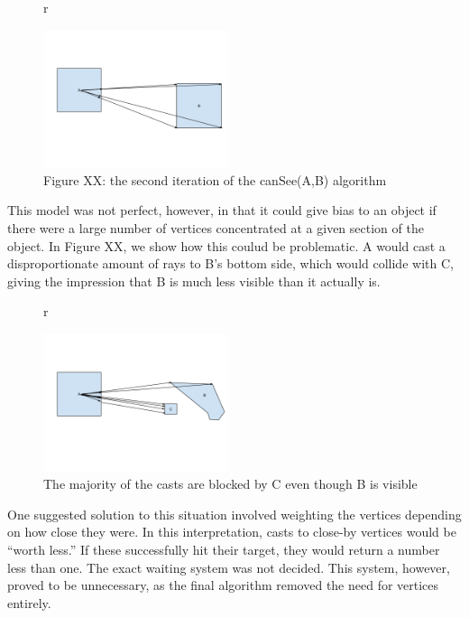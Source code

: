\begin{figure}{r}
	\begin{center}
		\includegraphics[width=0.48\textwidth]{figures/vision5.png}
	\end{center}
	\caption{Figure XX: the second iteration of the canSee(A,B) algorithm}
\end{figure}

This model was not perfect, however, in that it could give bias to an object if there were a large number of vertices concentrated at a given section of the object. In Figure XX, we show how this coulud be problematic. A would cast a disproportionate amount of rays to B's bottom side, which would collide with C, giving the impression that B is much less visible than it actually is.

\begin{figure}{r}
	\begin{center}
		\includegraphics[width=0.48\textwidth]{figures/vision6.png}
	\end{center}
	\caption{The majority of the casts are blocked by C even though B is visible}
\end{figure}

One suggested solution to this situation involved weighting the vertices depending on how close they were. In this interpretation, casts to close-by vertices would be “worth less.” If these successfully hit their target, they would return a number less than one. The exact waiting system was not decided. This system, however, proved to be unnecessary, as the final algorithm removed the need for vertices entirely. 

